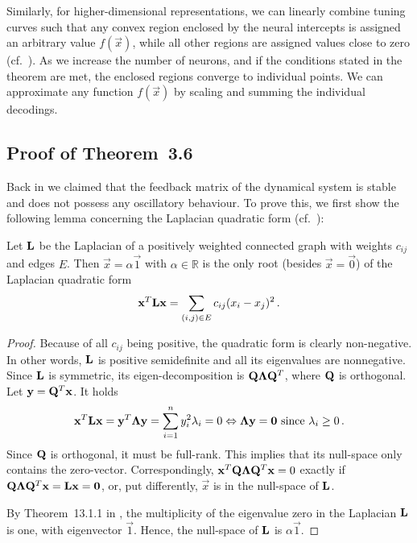 Similarly, for higher-dimensional representations, we can linearly combine tuning curves such that any convex region enclosed by the neural intercepts is assigned an arbitrary value $f(\vec x)$, while all other regions are assigned values close to zero (cf.~).
As we increase the number of neurons, and if the conditions stated in the theorem are met, the enclosed regions converge to individual points.
We can approximate any function $f(\vec x)$ by scaling and summing the individual decodings.

\subsection{Proof of Theorem~3.6}
\label{app:thm_nlif_convergence}

Back in  we claimed that the feedback matrix of the \nlif dynamical system is stable and does not possess any oscillatory behaviour.
To prove this, we first show the following lemma concerning the Laplacian quadratic form (cf.~\cite[Section~18.3.2]{spielman2012spectral}):
\begin{lemma}
\label{lem:laplacian_quadratic}
Let $\mathbf{L}$ be the Laplacian of a positively weighted connected graph with weights $c_{ij}$ and edges $E$.
Then $\vec x = \alpha \vec{1}$ with $\alpha \in \mathbb{R}$ is the only root (besides $\vec x = \vec{0}$) of the Laplacian quadratic form
\begin{align*}
	\mathbf{x}^T \mathbf{L} \mathbf{x} = \sum_{(i, j) \in E} c_{ij} (x_i - x_j)^2 \,.
\end{align*}
\end{lemma}
\begin{proof}
Because of all $c_{ij}$ being positive, the quadratic form is clearly non-negative. In other words, $\mathbf{L}$ is positive semidefinite and all its eigenvalues are nonnegative.
Since $\mathbf{L}$ is symmetric, its eigen-decomposition is $\mathbf{Q} \mathbf{\Lambda} \mathbf{Q}^T$, where $\mathbf{Q}$ is orthogonal.
Let $\mathbf{y} = \mathbf{Q}^T \mathbf{x}$.
It holds
\begin{align*}
	\mathbf{x}^T \mathbf{L} \mathbf{x} = \mathbf{y}^T \mathbf{\Lambda} \mathbf{y} = \sum_{i = 1}^n y_i^2 \lambda_i = 0 \Leftrightarrow \mathbf{\Lambda} \mathbf{y} = \mathbf{0} \text{ since } \lambda_i \geq 0\,.
\end{align*}
Since $\mathbf{Q}$ is orthogonal, it must be full-rank.
This implies that its null-space only contains the zero-vector.
Correspondingly, $\mathbf{x}^T \mathbf{Q} \mathbf{\Lambda} \mathbf{Q}^T \mathbf{x} = 0$ exactly if $\mathbf{Q} \mathbf{\Lambda} \mathbf{Q}^T \mathbf{x} = \mathbf{L} \mathbf{x} = \mathbf{0}$, or, put differently, $\vec x$ is in the null-space of $\mathbf{L}$.

By Theorem~13.1.1 in \citet[Chapter~13]{godsil2001algebraic}, the multiplicity of the eigenvalue zero in the Laplacian $\mathbf{L}$ is one, with eigenvector $\vec 1$.
Hence, the null-space of $\mathbf{L}$ is $\alpha \vec 1$.
\end{proof}

